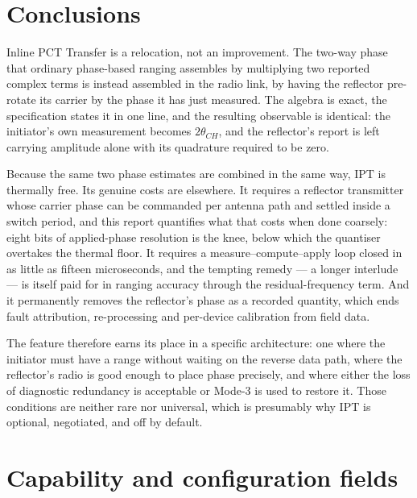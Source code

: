 \documentclass[11pt,a4paper]{article}
\newcommand{\IPT}{\ensuremath{\mathrm{IPT}}}
\begin{document}
\section{Conclusions}

Inline PCT Transfer is a relocation, not an improvement. The two-way phase that ordinary phase-based
ranging assembles by multiplying two reported complex terms is instead assembled in the radio link,
by having the reflector pre-rotate its carrier by the phase it has just measured. The algebra is
exact, the specification states it in one line, and the resulting observable is identical: the
initiator's own measurement becomes $2\theta_{CH}$, and the reflector's report is left carrying
amplitude alone with its quadrature required to be zero.

Because the same two phase estimates are combined in the same way, \IPT{} is thermally free. Its
genuine costs are elsewhere. It requires a reflector transmitter whose carrier phase can be commanded
per antenna path and settled inside a switch period, and this report quantifies what that costs when
done coarsely: eight bits of applied-phase resolution is the knee, below which the quantiser
overtakes the thermal floor. It requires a measure--compute--apply loop closed in as little as
fifteen microseconds, and the tempting remedy --- a longer interlude --- is itself paid for in
ranging accuracy through the residual-frequency term. And it permanently removes the reflector's
phase as a recorded quantity, which ends fault attribution, re-processing and per-device calibration
from field data.

The feature therefore earns its place in a specific architecture: one where the initiator must have a
range without waiting on the reverse data path, where the reflector's radio is good enough to place
phase precisely, and where either the loss of diagnostic redundancy is acceptable or Mode-3 is used
to restore it. Those conditions are neither rare nor universal, which is presumably why \IPT{} is
optional, negotiated, and off by default.

\appendix
\section{Capability and configuration fields}
\label{app:hci}
\end{document}
